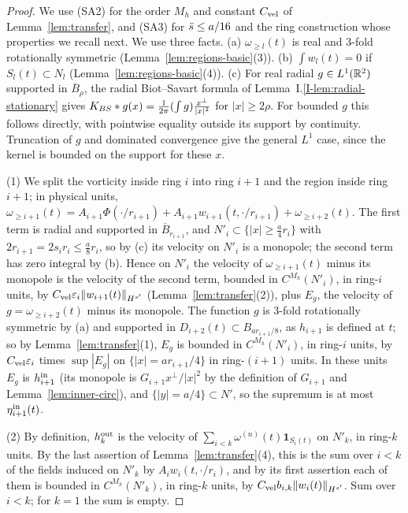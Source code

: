 \begin{proof}
We use (SA2) for the order $M_h$ and constant $C_{\mathrm{vel}}$ of
Lemma~\ref{lem:transfer}, and (SA3) for $\bar s\le a/16$ and the ring
construction whose properties we recall next.
We use three facts. (a) $\omega_{\ge l}(t)$ is real and $3$-fold rotationally symmetric
(Lemma~\ref{lem:regions-basic}(3)). (b) $\int w_l(t)=0$ if $S_l(t)\subset N_l$
(Lemma~\ref{lem:regions-basic}(4)). (c) For real radial $g\in L^1(\mathbb{R}^2)$
supported in $\overline B_\rho$, the radial Biot--Savart formula of
Lemma~I.\ref{I-lem:radial-stationary} gives
$K_{BS}\ast g(x)=\frac1{2\pi}(\int g)\frac{x^\perp}{|x|^2}$ for $|x|\ge2\rho$.
For bounded $g$ this follows directly, with pointwise equality outside its
support by continuity. Truncation of $g$ and dominated convergence give the
general $L^1$ case, since the kernel is bounded on the support for these $x$.

(1) We split the vorticity inside ring $i$ into ring $i+1$ and the region inside
ring $i+1$; in physical units,
$\omega_{\ge i+1}(t)=A_{i+1}\Phi(\cdot/r_{i+1})+A_{i+1}w_{i+1}(t,\cdot/r_{i+1})+\omega_{\ge i+2}(t)$.
The first term is radial and supported in $\overline B_{r_{i+1}}$, and
$N'_i\subset\{|x|\ge\frac a4r_i\}$ with $2r_{i+1}=2s_ir_i\le\frac a8r_i$, so by (c)
its velocity on $N'_i$ is a monopole; the second term has zero integral by (b).
Hence on $N'_i$ the velocity of $\omega_{\ge i+1}(t)$ minus its monopole is the
velocity of the second term, bounded in $C^{M_h}(N'_i)$, in ring-$i$ units, by
$C_{\mathrm{vel}} \varepsilon_i\|w_{i+1}(t)\|_{H^{s'}}$ (Lemma~\ref{lem:transfer}(2)), plus
$E_g$, the velocity of $g=\omega_{\ge i+2}(t)$ minus its monopole. The function
$g$ is $3$-fold rotationally symmetric by (a) and supported in $D_{i+2}(t)\subset B_{ar_{i+1}/8}$,
as $h_{i+1}$ is defined at $t$; so by Lemma~\ref{lem:transfer}(1), $E_g$ is
bounded in $C^{M_h}(N'_i)$, in ring-$i$ units, by $C_{\mathrm{vel}} \varepsilon_i$ times
$\sup|E_g|$ on $\{|x|=ar_{i+1}/4\}$ in ring-$(i+1)$ units. In these units $E_g$ is
$h^{\mathrm{in}}_{i+1}$ (its monopole is $G_{i+1}x^\perp/|x|^2$ by the definition of
$G_{i+1}$ and Lemma~\ref{lem:inner-circ}), and $\{|y|=a/4\}\subset N'$, so the
supremum is at most $\eta^{\mathrm{in}}_{i+1}(t)$.

(2) By definition, $h^{\mathrm{out}}_k$ is the velocity of
$\sum_{i<k}\omega^{(n)}(t)\mathbf 1_{S_i(t)}$ on $N'_k$, in ring-$k$ units. By the
last assertion of Lemma~\ref{lem:transfer}(4), this is the sum over $i<k$ of the
fields induced on $N'_k$ by $A_iw_i(t,\cdot/r_i)$, and by its first assertion each
of them is bounded in $C^{M_h}(N'_k)$, in ring-$k$ units, by
$C_{\mathrm{vel}} b_{i,k}\|w_i(t)\|_{H^{s'}}$. Sum over $i<k$; for $k=1$ the sum is empty.
\end{proof}

